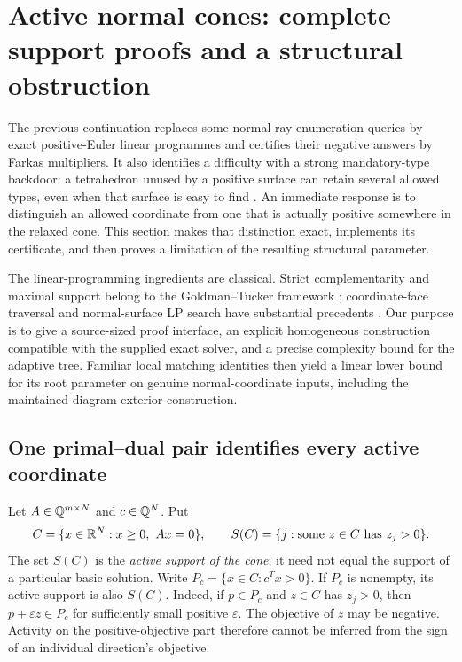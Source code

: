 \section{Active normal cones: complete support proofs and a structural obstruction}
\label{sec:active-faces}

The previous continuation replaces some normal-ray enumeration queries by
exact positive-Euler linear programmes and certifies their negative answers
by Farkas multipliers.  It also identifies a difficulty with a strong
mandatory-type backdoor: a tetrahedron unused by a positive surface can
retain several allowed types, even when that surface is easy to find
\cite{priorDual}.  An immediate response is to distinguish an allowed
coordinate from one that is actually positive somewhere in the relaxed cone.
This section makes that distinction exact, implements its certificate, and
then proves a limitation of the resulting structural parameter.

The linear-programming ingredients are classical.  Strict complementarity
and maximal support belong to the Goldman--Tucker framework
\cite{GoldmanTucker}; coordinate-face traversal and normal-surface LP search
have substantial precedents \cite{BurtonFaces,BurtonOzlen}.  Our purpose is
to give a source-sized proof interface, an explicit homogeneous construction
compatible with the supplied exact solver, and a precise complexity bound
for the adaptive tree.  Familiar local matching identities then yield a
linear lower bound for its root parameter on genuine normal-coordinate
inputs, including the maintained diagram-exterior construction.

\subsection{One primal--dual pair identifies every active coordinate}

Let $A\in\mathbb Q^{m\times N}$ and $c\in\mathbb Q^N$.  Put
\begin{equation}\label{eq:active-cone-def}
 C=\{x\in\mathbb R^N:x\ge0,\ Ax=0\},\qquad
 S(C)=\{j:\text{some }z\in C\text{ has }z_j>0\}.
\end{equation}
The set $S(C)$ is the \emph{active support of the cone}; it need not equal the
support of a particular basic solution.  Write
$P_c=\{x\in C:c^Tx>0\}$.  If $P_c$ is nonempty, its active support is also
$S(C)$.  Indeed, if $p\in P_c$ and $z\in C$ has $z_j>0$, then
$p+\varepsilon z\in P_c$ for sufficiently small positive $\varepsilon$.
The objective of $z$ may be negative.  Activity on the positive-objective
part therefore cannot be inferred from the sign of an individual direction's
objective.

